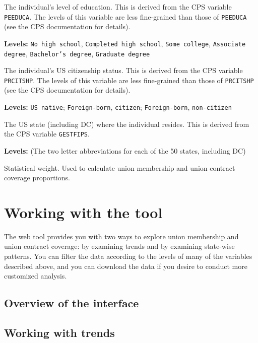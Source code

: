 \documentclass[letterpaper,12pt]{article}
\begin{document}
\begin{description}[style=multiline,leftmargin=3cm,font=\normalfont]
\item[\texttt{educ}] The individual's level of education. This is
  derived from the CPS variable \texttt{PEEDUCA}. The levels of this
  variable are less fine-grained than those of \texttt{PEEDUCA} (see
  the CPS documentation for details).

  \textbf{Levels:} \texttt{No high school}, \texttt{Completed high
    school}, \texttt{Some college}, \texttt{Associate degree},
  \texttt{Bachelor's degree}, \texttt{Graduate degree}

\item[\texttt{citizen}] The individual's US citizenship status. This
  is derived from the CPS variable \texttt{PRCITSHP}. The levels of
  this variable are less fine-grained than those of \texttt{PRCITSHP}
  (see the CPS documentation for details).

  \textbf{Levels:} \texttt{US native}; \texttt{Foreign-born},
  \texttt{citizen}; \texttt{Foreign-born}, \texttt{non-citizen}

\item[\texttt{state}] The US state (including DC) where the individual
  resides. This is derived from the CPS variable \texttt{GESTFIPS}.

  \textbf{Levels:} (The two letter abbreviations for each of the 50
  states, including DC)

\item[\texttt{weight}] Statistical weight. Used to calculate union
  membership and union contract coverage proportions.

\end{description}

\section{Working with the tool}

The web tool provides you with two ways to explore union membership
and union contract coverage: by examining trends and by examining
state-wise patterns. You can filter the data according to the levels
of many of the variables described above, and you can download the
data if you desire to conduct more customized analysis.

\subsection{Overview of the interface}

\subsection{Working with trends}
\end{document}
